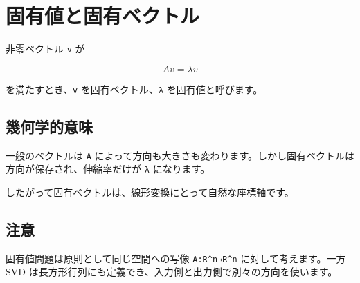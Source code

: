 \documentclass[
  11pt,
  a4paper,
]{ltjsarticle}
\author{}
\date{}
\begin{document}
\hypertarget{ux56faux6709ux5024ux3068ux56faux6709ux30d9ux30afux30c8ux30eb}{%
\section{固有値と固有ベクトル}\label{ux56faux6709ux5024ux3068ux56faux6709ux30d9ux30afux30c8ux30eb}}

非零ベクトル \texttt{v} が

\[
Av=\lambda v
\]

を満たすとき、\texttt{v} を固有ベクトル、\texttt{λ} を固有値と呼びます。

\hypertarget{ux5e7eux4f55ux5b66ux7684ux610fux5473}{%
\subsection{幾何学的意味}\label{ux5e7eux4f55ux5b66ux7684ux610fux5473}}

一般のベクトルは \texttt{A}
によって方向も大きさも変わります。しかし固有ベクトルは方向が保存され、伸縮率だけが
\texttt{λ} になります。

したがって固有ベクトルは、線形変換にとって自然な座標軸です。

\hypertarget{ux6ce8ux610f}{%
\subsection{注意}\label{ux6ce8ux610f}}

固有値問題は原則として同じ空間への写像 \texttt{A:R\^{}n→R\^{}n}
に対して考えます。一方 SVD
は長方形行列にも定義でき、入力側と出力側で別々の方向を使います。
\end{document}
